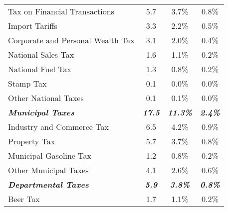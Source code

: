 \documentclass[12pt]{article}
\begin{document}
\begin{table}
\begin{tabular}{lccc}
Tax on Financial Transactions                           & 5.7                           & 3.7\%                    & 0.8\%                    \\
Import Tariffs                                          & 3.3                           & 2.2\%                    & 0.5\%                    \\
Corporate and Personal Wealth Tax                       & 3.1                           & 2.0\%                    & 0.4\%                    \\
National Sales Tax                                      & 1.6                           & 1.1\%                    & 0.2\%                    \\
National Fuel Tax                                       & 1.3                           & 0.8\%                    & 0.2\%                    \\
Stamp Tax                                               & 0.1                           & 0.0\%                    & 0.0\%                    \\
Other National Taxes                                    & 0.1                           & 0.1\%                    & 0.0\%                    \\ \hline
\textit{\textbf{Municipal Taxes}}                       & \textit{\textbf{17.5}}        & \textit{\textbf{11.3\%}} & \textit{\textbf{2.4\%}}  \\
Industry and Commerce Tax                               & 6.5                           & 4.2\%                    & 0.9\%                    \\
Property Tax                                            & 5.7                           & 3.7\%                    & 0.8\%                    \\
Municipal Gasoline Tax                                  & 1.2                           & 0.8\%                    & 0.2\%                    \\
Other Municipal Taxes                                   & 4.1                           & 2.6\%                    & 0.6\%                    \\ \hline
\textit{\textbf{Departmental Taxes}}                    & \textit{\textbf{5.9}}         & \textit{\textbf{3.8\%}}  & \textit{\textbf{0.8\%}}  \\
Beer Tax                                                & 1.7                           & 1.1\%                    & 0.2\%                    \\

\end{tabular}
\end{table}
\end{document}
